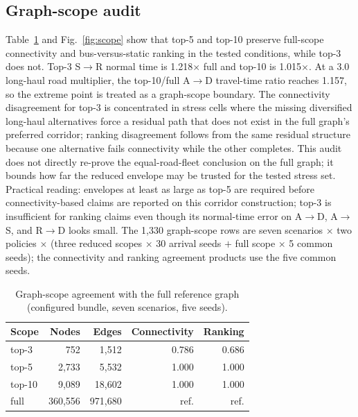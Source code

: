 \documentclass{ieeeaccess}
\begin{document}
\subsection{Graph-scope audit}
Table~\ref{tab:scope} and Fig.~\ref{fig:scope} show that top-5 and top-10 preserve full-scope connectivity and bus-versus-static ranking in the tested conditions, while top-3 does not. Top-3 S$\rightarrow$R normal time is 1.218$\times$ full and top-10 is 1.015$\times$. At a 3.0 long-haul road multiplier, the top-10/full A$\rightarrow$D travel-time ratio reaches 1.157, so the extreme point is treated as a graph-scope boundary. The connectivity disagreement for top-3 is concentrated in stress cells where the missing diversified long-haul alternatives force a residual path that does not exist in the full graph's preferred corridor; ranking disagreement follows from the same residual structure because one alternative fails connectivity while the other completes. This audit does not directly re-prove the equal-road-fleet conclusion on the full graph; it bounds how far the reduced envelope may be trusted for the tested stress set. Practical reading: envelopes at least as large as top-5 are required before connectivity-based claims are reported on this corridor construction; top-3 is insufficient for ranking claims even though its normal-time error on A$\rightarrow$D, A$\rightarrow$S, and R$\rightarrow$D looks small. The 1{,}330 graph-scope rows are seven scenarios $\times$ two policies $\times$ (three reduced scopes $\times$ 30 arrival seeds $+$ full scope $\times$ 5 common seeds); the connectivity and ranking agreement products use the five common seeds.

\begin{table}[!t]
\caption{Graph-scope agreement with the full reference graph (configured bundle, seven scenarios, five seeds).}
\label{tab:scope}
\centering
\footnotesize
\begin{tabular}{@{}lrrrr@{}}
\hline
Scope & Nodes & Edges & Connectivity & Ranking \\
\hline
top-3 & 752 & 1{,}512 & 0.786 & 0.686 \\
top-5 & 2{,}733 & 5{,}532 & 1.000 & 1.000 \\
top-10 & 9{,}089 & 18{,}602 & 1.000 & 1.000 \\
full & 360{,}556 & 971{,}680 & ref. & ref. \\
\hline
\end{tabular}
\end{table}
\end{document}
